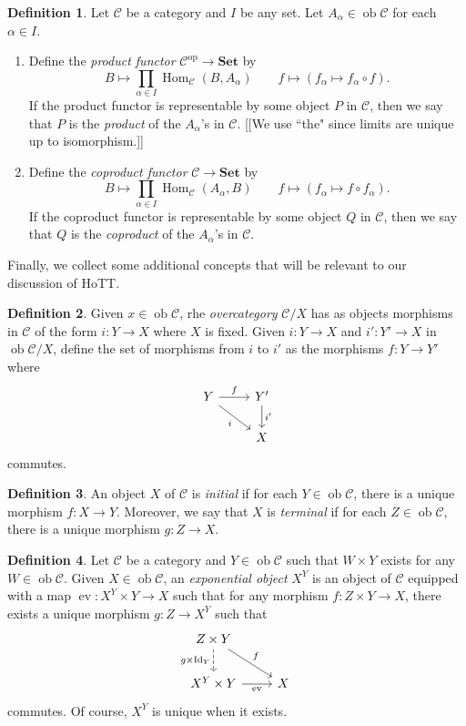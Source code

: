 \documentclass[10pt,letterpaper,cm]{nupset}
\theoremstyle{definition}
\newtheorem*{definition}{Definition}
\newcommand{\1}{\mathbf{1}}
\renewcommand{\c}{\mathscr{C}}
\newcommand{\0}{\vec 0}
\DeclareMathOperator{\id}{Id}
\DeclareMathOperator{\op}{op}
\DeclareMathOperator{\ob}{ob}
\DeclareMathOperator{\ev}{ev}
\DeclareMathOperator{\Hom}{Hom}
\begin{document}
\begin{definition} Let $\c$ be a category and $I$ be any set. Let $A_{\alpha} \in \ob \c$ for each $\alpha \in I$.
\begin{enumerate}
\item  Define the \textit{product functor} $\c^{\op} \to \mathbf{Set}$ by $$B \mapsto \prod_{\alpha \in I}\Hom_{\c}(B, A_{\alpha}) \quad \quad f \mapsto (f_{\alpha} \mapsto f_{\alpha} \circ f).$$ If the product functor is representable by some object $P$ in $\c$, then we say that $P$ is the \textit{product} of the $A_{\alpha}$'s in $\c$. {[[We use ``the" since limits are unique up to isomorphism.]]}
\item Define the \textit{coproduct functor} $\c \to \mathbf{Set}$ by $$ B \mapsto \prod_{\alpha \in I} \Hom_{\c}(A_{\alpha}, B) \quad \quad f \mapsto (f_{\alpha} \mapsto f \circ f_{\alpha}).$$ If the coproduct functor is representable by some object $Q$ in $\c$, then we say that $Q$ is the \textit{coproduct} of the $A_{\alpha}$'s in $\c$.
\end{enumerate}
\end{definition}

Finally, we collect some additional concepts that will be relevant to our discussion of HoTT.

\begin{definition}
Given $x \in \ob \c$, rhe \textit{overcategory} ${\c}/{X}$ has as objects morphisms in $\c$ of the form $i : Y \to X$ where $X$ is fixed. Given $i:  Y \to X$ and  $i' : Y' \to X$ in $\ob {\c}/{X}$, define the set of morphisms from $i$ to $i'$ as the morphisms $f: Y \to Y'$ where
\[ \begin{tikzcd}
Y \arrow[r, "f"] \arrow[swap, dr,  " i "] & Y' \arrow[d, "i '"] \\%
 & X
\end{tikzcd}
\]
commutes.
\end{definition}

\begin{definition}
An object $X$ of $\c$ is \textit{initial} if for each $Y \in \ob \c$, there is a unique morphism $f : X \to Y$. Moreover, we say that $X$ is \textit{terminal} if for each $Z \in \ob \c$, there is a unique morphism $g : Z \to X$. 
\end{definition}

\begin{definition}
Let $\c$ be a category and $Y\in \ob{\c}$ such that $W\times Y$ exists for any $W\in \ob{\c}$. Given $X\in \ob{\c}$, an \textit{exponential object} $X^Y$ is an object of $\c$  equipped with a map $\ev : X^Y \times Y \to X$ such that for any morphism $f : Z\times Y \to X$, there exists a unique morphism $g: Z \to X^Y$ such that 
\[
\begin{tikzcd}
Z\times Y \arrow[d, "g\times \id_Y"', dashed] \arrow[rd, "f"] &  \\
X^Y \times Y \arrow[r, "\ev"'] & X
\end{tikzcd}
\] commutes. Of course, $X^Y$ is unique when it exists.
\end{definition}
\end{document}
